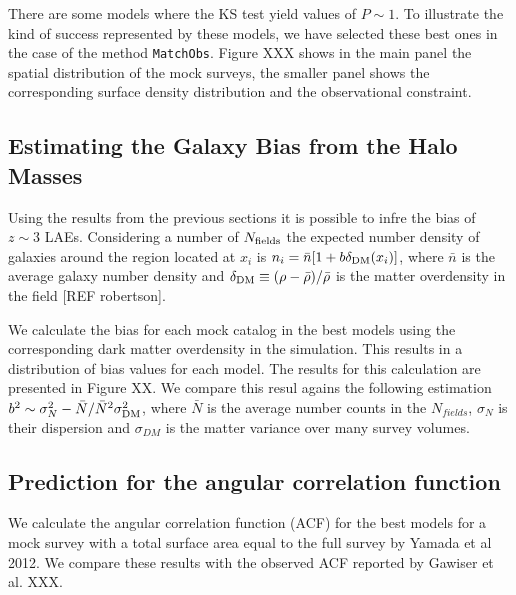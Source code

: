 \documentclass{emulateapj}
\begin{document}
There are some models where the KS test yield values of $P\sim 1$. To illustrate the kind of success represented by these models, we have selected these best ones in the case of the method {\tt{MatchObs}}. Figure XXX shows in the main panel the spatial distribution of the mock surveys, the smaller panel shows the corresponding surface density distribution and the observational constraint.



\subsection{Estimating the Galaxy Bias from the Halo Masses}
Using the results from the previous sections it is possible to infre the bias of $z\sim 3$ LAEs. Considering a number of $N_{\rm fields}$ the expected number density of galaxies around the region located at $x_{i}$ is $n_{i}=\bar{n}[1+ b\delta_{\rm DM}(x_{i})]$, where $\bar{n}$ is the average galaxy number density and $\delta_{\rm DM}\equiv (\rho - \bar{\rho})/\bar{\rho}$ is the matter overdensity in the field [REF robertson].

We calculate the bias for each mock catalog in the best models using the corresponding dark matter overdensity in the simulation. This results in a distribution of bias values for each model. The results for this calculation are presented in Figure XX.  We compare this resul agains the following estimation $b^{2}\sim {\sigma_{N}^{2} - \bar{N}}/\bar{N}^{2}\sigma_{\rm DM}^{2}$, where $\bar{N}$ is the average number counts in the $N_{fields}$, $\sigma_{N}$ is their dispersion and $\sigma_{DM}$ is the matter variance over many survey volumes.

\subsection{Prediction for the angular correlation function}

We calculate the angular correlation function (ACF) for the best models for a mock survey with a total surface area equal to the full survey by Yamada et al 2012. We compare these results with the observed ACF reported by Gawiser et al. XXX. 
\end{document}
